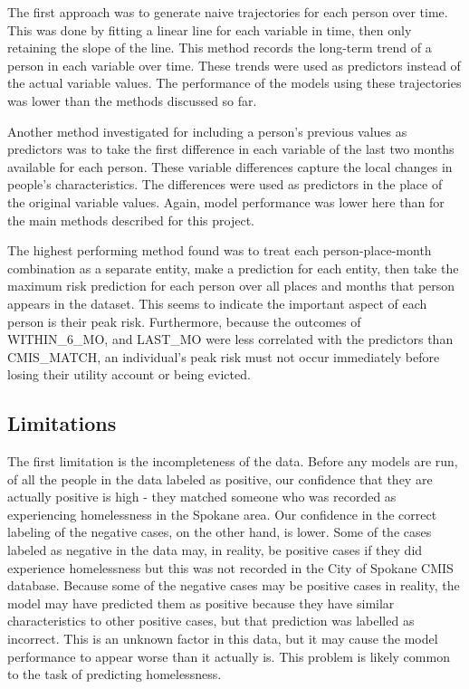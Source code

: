 \documentclass[10pt,letterpaper]{article}
\newcommand{\red}[1]{{\color{red}{#1}}}
\begin{document}
The first approach was to generate naive trajectories for each person over time. This was done by fitting a linear line for each variable in time, then only retaining the slope of the line. This method records the long-term trend of a person in each variable over time. These trends were used as predictors instead of the actual variable values. The performance of the models using these trajectories was lower than the methods discussed so far.

Another method investigated for including a person's previous values as predictors was to take the first difference in each variable of the last two months available for each person. These variable differences capture the local changes in people's characteristics. The differences were used as predictors in the place of the original variable values. Again, model performance was lower here than for the main methods described for this project.

The highest performing method found was to treat each person-place-month combination as a separate entity, make a prediction for each entity, then take the maximum risk prediction for each person over all places and months that person appears in the dataset. This seems to indicate the important aspect of each person is their peak risk. Furthermore, because the outcomes of WITHIN\_6\_MO, and LAST\_MO were less correlated with the predictors than CMIS\_MATCH, an individual's peak risk must not occur immediately before losing their utility account or being evicted. 

\red{add that more appropriate methods could be used to deal with time series - LSTM}

\subsection*{Limitations}
The first limitation is the incompleteness of the data. Before any models are run, of all the people in the data labeled as positive, our confidence that they are actually positive is high - they matched someone who was recorded as experiencing homelessness in the Spokane area. Our confidence in the correct labeling of the negative cases, on the other hand, is lower. Some of the cases labeled as negative in the data may, in reality, be positive cases if they did experience homelessness but this was not recorded in the City of Spokane CMIS database. Because some of the negative cases may be positive cases in reality, the model may have predicted them as positive because they have similar characteristics to other positive cases, but that prediction was labelled as incorrect. This is an unknown factor in this data, but it may cause the model performance to appear worse than it actually is. This problem is likely common to the task of predicting homelessness. \red{add citation}
\end{document}
